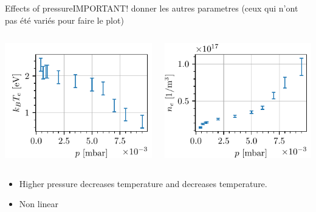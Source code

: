 \documentclass[10pt]{beamer}
\begin{document}
\begin{frame}{Effects of pressure}{IMPORTANT! donner les autres parametres (ceux qui n'ont pas été variés pour faire le plot)}

    \begin{columns}
        \centering
        {\includegraphics[scale=1]{../figures/temperatureeV_pressure.pdf}}


        \centering
        {\includegraphics[scale=1]{../figures/density_pressure.pdf}}

    \end{columns}
    \begin{itemize}
        \item Higher pressure decreases temperature and decreases temperature.
        \item Non linear
    \end{itemize}
\end{frame}
\end{document}
